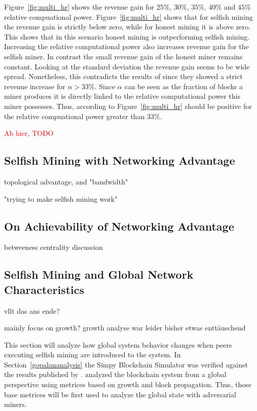 Figure~\ref{fig:multi_hr} shows the revenue gain for $25\% $, $30\%$, $35\% $, $40\% $ and $45\% $ relative compuational power. Figure~\ref{fig:multi_hr} shows that for selfish mining the revenue gain is strictly below zero, while for honest mining it is above zero. This shows that in this scenario honest mining is outperforming selfish mining. Increasing the relative computational power also increases revenue gain for the selfish miner. In contrast the small revenue gain of the honest miner remains constant. Looking at the standard deviation the revenue gain seems to be wide spread. Nonetheless, this contradicts the results of  since they showed a strict revenue increase for $\alpha > 33\% $. Since $\alpha$ can be seen as the fraction of blocks a miner produces it is directly linked to the relative computational power this miner possesses. Thus, according to  Figure~\ref{fig:multi_hr} should be positive for the relative compuational power greater than $33\% $.



\newpage
\textcolor{red}{Ab hier, TODO}
\subsection{Selfish Mining with Networking Advantage}

topological advantage, and "bandwidth"

"trying to make selfish mining work"
\subsection{On Achievability of Networking Advantage}
betweeness centrality discussion
\subsection{Selfish Mining and Global Network Characteristics}
vllt das ans ende?	

mainly focus on growth? growth analyse war leider bisher etwas enttäuschend

This section will analyze how global system behavior changes when peers executing selfish mining are introduced to the system. In Section~\ref{gopalananalysis} the Simpy Blockchain Simulator was verified against the results published by \gopalan. \gopalan analyzed the blockchain system from a global perspective using metrices based on growth and block propagation. Thus, those base metrices will be first used to analyze the global state with adversarial miners.

